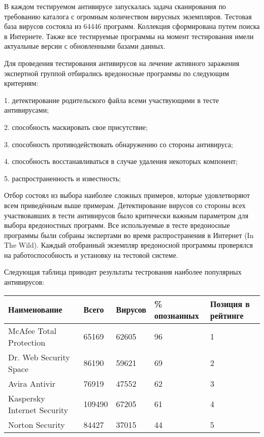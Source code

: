 \documentclass[%
preprint,
amsmath,amssymb,
aps,
]{revtex4-2}
\begin{document}
В каждом тестируемом антивирусе запускалась задача сканирования по требованию каталога с огромным количеством вирусных экземпляров. Тестовая база вирусов состояла из 64446 программ. Коллекция сформирована путем поиска в Интернете. Также все тестируемые программы на момент тестирования имели актуальные версии с обновленными базами данных.

Для проведения тестирования антивирусов на лечение активного заражения экспертной группой отбирались вредоносные программы по следующим критериям:

1. детектирование родительского файла всеми участвующими в тесте антивирусами;

2. способность маскировать свое присутствие;

3. способность противодействовать обнаружению со стороны антивируса;

4. способность восстанавливаться в случае удаления некоторых компонент;

5. распространенность и известность;

Отбор состоял из выбора наиболее сложных примеров, которые удовлетворяют всем приведённым выше примерам. Детектирование вирусов со стороны всех участвовавших в тести антивирусов было критически важным параметром для выбора вредоностных программ. Все используемые в тесте вредоносные программы были собраны экспертами во время распространения в Интернет (In The Wild). Каждый отобранный экземпляр вредоносной программы проверялся на работоспособность и установку на тестовой системе.

Следующая таблица приводит результаты тестрования наиболее популярных антивирусов:
\begin{table}[h]
\begin{tabular}{|l|l|l|l|l|}
\hline
Наименование                                       & Всего  & Вирусов & \% опознанных & Позиция в рейтинге \\ \hline
McAfee Total Protection                            & 65169  & 62605   & 96 & 1                  \\ \hline
Dr. Web Security Space                             & 86190  & 59621   & 69 & 2                  \\ \hline
Avira Antivir                                      & 76919  & 47552   & 62 & 3                  \\ \hline
{\color[HTML]{202122} Kaspersky Internet Security} & 109490 & 67205   & 61 & 4                  \\ \hline
Norton Security                                    & 84427  & 37015   & 44 & 5                  \\ \hline
\end{tabular}
\end{table}
\end{document}
